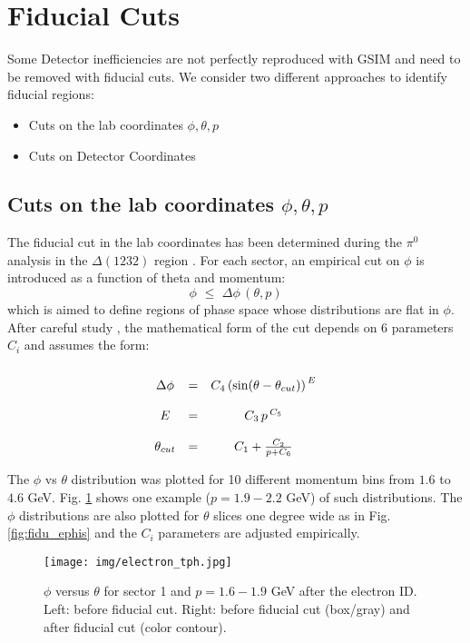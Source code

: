 \section{Fiducial Cuts}
Some Detector inefficiencies are not perfectly reproduced with GSIM and need to be
removed with fiducial cuts. We consider two different approaches to identify fiducial regions:
\begin{itemize}
\item Cuts on the lab coordinates $\phi, \theta, p$
\item Cuts on Detector Coordinates
\end{itemize}



\subsection{Cuts on the lab coordinates $\phi, \theta, p$}
The fiducial cut in the lab coordinates has been determined during the $\pi^0$ analysis in
the $\Delta(1232)$ region \cite{bib:pi0_Delta}.
For each sector, an empirical cut on $\phi$ is introduced as a function of theta and momentum:
$$ 
 \phi \,\,\le\,\, \Delta\phi \,(\theta, p)
$$
which is aimed to define regions of phase space whose distributions are flat in $\phi$.
After careful study \cite{bib:fid_e}, the mathematical form of the cut depends on 6 parameters  $C_i$
and assumes the form:\vspace{-0.3 cm}
$$
\begin{array}{c c c}
\\
\Delta\phi   & = &  C_4 \left( \sin (\theta - \theta_{cut}) \right) ^{\,E} \\
\\
E        & = &  C_3\, p\, ^{C_5} \\
\\
\theta_{cut} & = &  C_1 + \frac{C_2}{p + C_6}
\end{array}
$$

The $\phi$ vs $\theta$ distribution was plotted for 10 different momentum bins from $1.6$ to $4.6$ GeV.
Fig. \ref{fig:fidu_etph} shows one example ($p=1.9-2.2$ GeV) of such distributions.
The $\phi$ distributions are also plotted for $\theta$ slices one degree wide as in Fig. \ref{fig:fidu_ephis}
and the $C_i$ parameters are adjusted empirically.

\begin{figure}[ht]
	\centering
		\texttt{[image: img/electron\_tph.jpg]}
			\caption{$\phi$ versus $\theta$ for sector 1 and $p=1.6-1.9$ GeV after the
						electron ID. Left: before fiducial cut. Right: before fiducial cut
						(box/gray) and after fiducial cut (color contour). }
			\label{fig:fidu_etph}
\end{figure}


